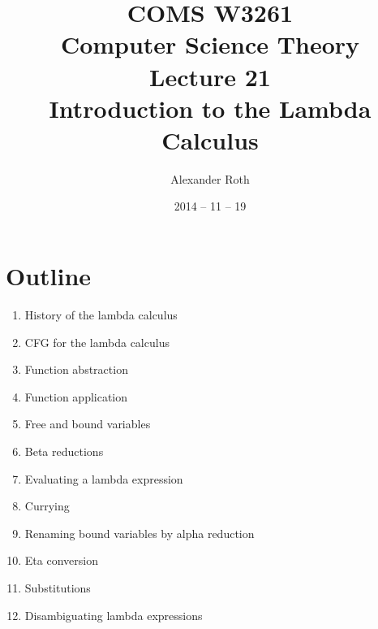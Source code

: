 \documentclass[]{article}
\begin{document}
\newcommand*{\xml}[1]{\texttt{<#1>}}
\theoremstyle{definition}
\newtheorem{thm}{Theorem}
\title{COMS W3261 \\ Computer Science Theory \\ Lecture 21 \\ Introduction to
the Lambda Calculus}
\author{Alexander Roth}
\date{2014 -- 11 -- 19}
\maketitle

\section*{Outline}
\begin{enumerate}
\item History of the lambda calculus
\item CFG for the lambda calculus
\item Function abstraction
\item Function application
\item Free and bound variables
\item Beta reductions
\item Evaluating a lambda expression
\item Currying
\item Renaming bound variables by alpha reduction
\item Eta conversion
\item Substitutions
\item Disambiguating lambda expressions
\end{enumerate}
\end{document}
